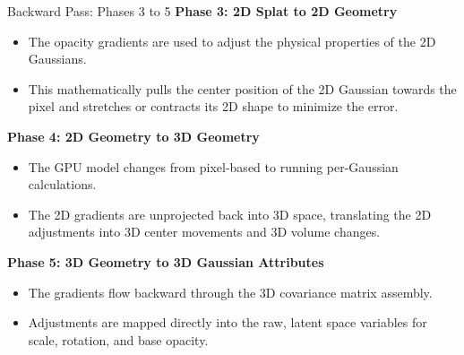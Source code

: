 \begin{frame}{Backward Pass: Phases 3 to 5}
    \textbf{Phase 3: 2D Splat to 2D Geometry}
    \begin{itemize}
        \justifying
        \item The opacity gradients are used to adjust the physical properties of the 2D Gaussians.
        \item This mathematically pulls the center position of the 2D Gaussian towards the pixel and stretches or contracts its 2D shape to minimize the error.
    \end{itemize}

    \pause
    \vspace{1em}

    \textbf{Phase 4: 2D Geometry to 3D Geometry}
    \begin{itemize}
        \justifying
        \item The GPU model changes from pixel-based to running per-Gaussian calculations.
        \item The 2D gradients are unprojected back into 3D space, translating the 2D adjustments into 3D center movements and 3D volume changes.
    \end{itemize}

    \pause
    \vspace{1em}

    \textbf{Phase 5: 3D Geometry to 3D Gaussian Attributes}
    \begin{itemize}
        \justifying
        \item The gradients flow backward through the 3D covariance matrix assembly.
        \item Adjustments are mapped directly into the raw, latent space variables for scale, rotation, and base opacity.
    \end{itemize}
\end{frame}

